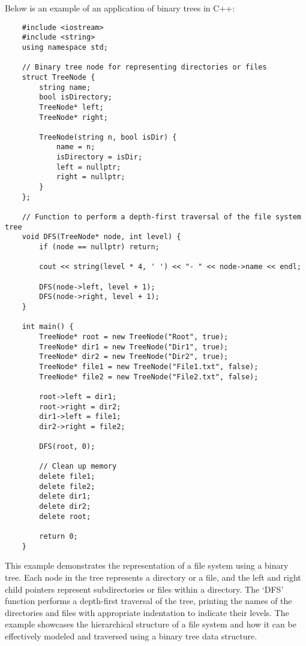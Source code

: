 \begin{solution}
    Below is an example of an application of binary trees in C++:

    \horizontalline

    \begin{verbatim}
    #include <iostream>
    #include <string>
    using namespace std;
    
    // Binary tree node for representing directories or files
    struct TreeNode {
        string name;
        bool isDirectory;
        TreeNode* left;
        TreeNode* right;
    
        TreeNode(string n, bool isDir) {
            name = n;
            isDirectory = isDir;
            left = nullptr;
            right = nullptr;
        }
    };
    
    // Function to perform a depth-first traversal of the file system tree
    void DFS(TreeNode* node, int level) {
        if (node == nullptr) return;
        
        cout << string(level * 4, ' ') << "- " << node->name << endl;
    
        DFS(node->left, level + 1);
        DFS(node->right, level + 1);
    }
    
    int main() {
        TreeNode* root = new TreeNode("Root", true);
        TreeNode* dir1 = new TreeNode("Dir1", true);
        TreeNode* dir2 = new TreeNode("Dir2", true);
        TreeNode* file1 = new TreeNode("File1.txt", false);
        TreeNode* file2 = new TreeNode("File2.txt", false);
    
        root->left = dir1;
        root->right = dir2;
        dir1->left = file1;
        dir2->right = file2;
    
        DFS(root, 0);
    
        // Clean up memory
        delete file1;
        delete file2;
        delete dir1;
        delete dir2;
        delete root;
    
        return 0;
    }  
    \end{verbatim}

    \horizontalline

    This example demonstrates the representation of a file system using a binary tree. Each node in the tree represents a directory or a file, and the left and right child pointers represent subdirectories or files within a directory. The `DFS' function performs a depth-first traversal of the tree, printing the 
    names of the directories and files with appropriate indentation to indicate their levels. The example showcases the hierarchical structure of a file system and how it can be effectively modeled and traversed using a binary tree data structure.
\end{solution}


